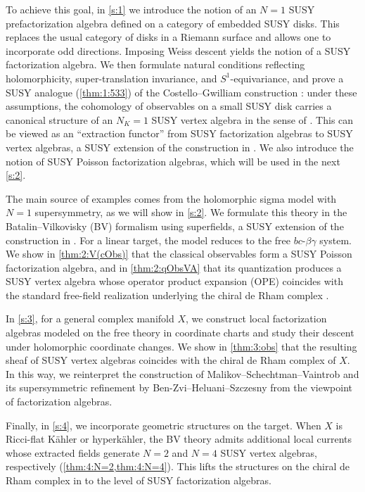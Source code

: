 \documentclass[final,reqno]{amsart}
\numberwithin{equation}{section}
\theoremstyle{definition}
\begin{document}
To achieve this goal, in \cref{s:1} we introduce the notion of an $N=1$ 
SUSY prefactorization algebra defined on a category of embedded SUSY disks. 
This replaces the usual category of disks in a Riemann surface 
and allows one to incorporate odd directions. 
Imposing Weiss descent yields the notion of a SUSY factorization algebra.
We then formulate natural conditions reflecting holomorphicity, 
super-translation invariance, and $S^1$-equivariance, 
and prove a SUSY analogue (\cref{thm:1:533}) 
of the Costello--Gwilliam construction \cite[\S5.3]{CG1}: 
under these assumptions, the cohomology of observables 
on a small SUSY disk carries a canonical structure of 
an $N_K=1$ SUSY vertex algebra in the sense of \cite[\S4]{HK}. 
This can be viewed as an ``extraction functor'' from 
SUSY factorization algebras to SUSY vertex algebras,
a SUSY extension of the construction in \cite[Chapter 5]{CG1}.
We also introduce the notion of SUSY Poisson factorization algebras,
which will be used in the next \cref{s:2}.

The main source of examples comes from the holomorphic sigma model
with $N=1$ supersymmetry, as we will show in \cref{s:2}. 
We formulate this theory in the Batalin--Vilkovisky (BV) 
formalism using superfields, 
a SUSY extension of the construction in \cite{CG2}. 
For a linear target, the model reduces to the free $bc$-$\beta\gamma$ system.
We show in \cref{thm:2:V(cObs)} that the classical observables 
form a SUSY Poisson factorization algebra,
and in \cref{thm:2:qObsVA} that its quantization produces 
a SUSY vertex algebra whose operator product expansion (OPE)
coincides with the standard free-field realization 
underlying the chiral de Rham complex \cite{MSV}.

In \cref{s:3}, for a general complex manifold $X$, 
we construct local factorization algebras modeled on 
the free theory in coordinate charts 
and study their descent under holomorphic coordinate changes. 
We show in \cref{thm:3:obs} that the resulting sheaf of SUSY vertex algebras
coincides with the chiral de Rham complex of $X$. 
In this way, we reinterpret the construction of 
Malikov--Schechtman--Vaintrob \cite{MSV} and 
its supersymmetric refinement by Ben-Zvi--Heluani--Szczesny \cite{BHS}
from the viewpoint of factorization algebras.

Finally, in \cref{s:4}, we incorporate geometric structures on the target.
When $X$ is Ricci-flat K\"ahler or hyperk\"ahler, 
the BV theory admits additional local currents whose extracted fields
generate $N=2$ and $N=4$ SUSY vertex algebras, respectively
(\cref{thm:4:N=2,thm:4:N=4}). 
This lifts the structures on the chiral de Rham complex in \cite{BHS} 
to the level of SUSY factorization algebras.
\end{document}
